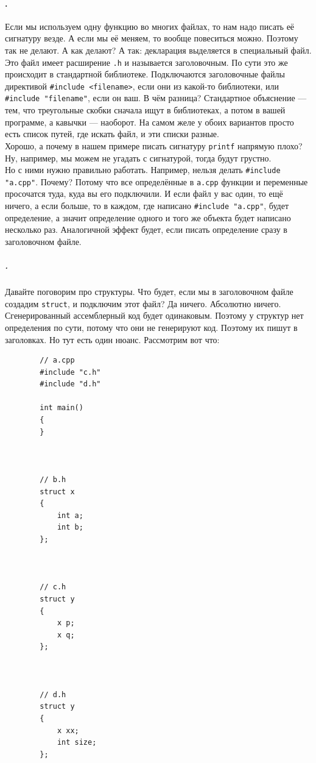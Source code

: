 \documentclass{article}
\begin{document}
    \paragraph{.}
    Если мы используем одну функцию во многих файлах, то нам надо писать её сигнатуру везде. А если мы её меняем, то вообще повеситься можно. Поэтому так не делают. А как делают? А так: декларация выделяется в специальный файл. Это файл имеет расширение \texttt{.h} и называется заголовочным. По сути это же происходит в стандартной библиотеке. Подключаются заголовочные файлы директивой \texttt{#include <filename>}, если они из какой-то библиотеки, или \texttt{#include "filename"}, если он ваш. В чём разница? Стандартное объяснение --- тем, что треугольные скобки сначала ищут в библиотеках, а потом в вашей программе, а кавычки --- наоборот. На самом желе у обоих вариантов просто есть список путей, где искать файл, и эти списки разные.\\
    Хорошо, а почему в нашем примере писать сигнатуру \texttt{printf} напрямую плохо? Ну, например, мы можем не угадать с сигнатурой, тогда будут грустно.\\
    Но с ними нужно правильно работать. Например, нельзя делать \texttt{#include "a.cpp"}. Почему? Потому что все определённые в \texttt{a.cpp} функции и переменные просочатся туда, куда вы его подключили. И если файл у вас один, то ещё ничего, а если больше, то в каждом, где написано \texttt{#include "a.cpp"}, будет определение, а значит определение одного и того же объекта будет написано несколько раз. Аналогичной эффект будет, если писать определение сразу в заголовочном файле.
    \subparagraph{.}
    Давайте поговорим про структуры. Что будет, если мы в заголовочном файле создадим \texttt{struct}, и подключим этот файл? Да ничего. Абсолютно ничего. Сгенерированный ассемблерный код будет одинаковым. Поэтому у структур нет определения по сути, потому что они не генерируют код. Поэтому их пишут в заголовках. Но тут есть один нюанс. Рассмотрим вот что:
    \begin{verbatim}
        // a.cpp
        #include "c.h"
        #include "d.h"

        int main()
        {
        }



        // b.h
        struct x
        {
            int a;
            int b;
        };



        // c.h
        struct y
        {
            x p;
            x q;
        };



        // d.h
        struct y
        {
            x xx;
            int size;
        };
    \end{verbatim}
\end{document}
